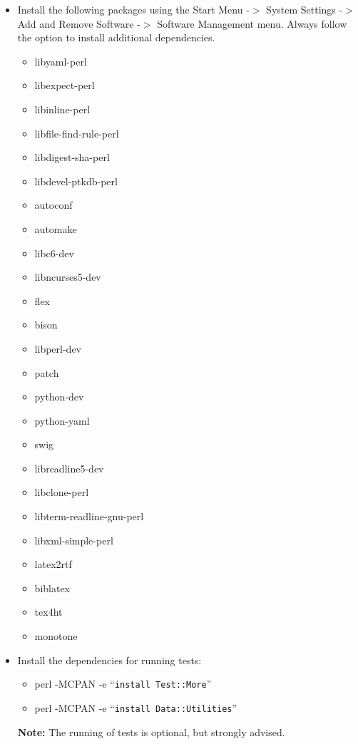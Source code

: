 \documentclass[12pt]{article}
\begin{document}
\begin{itemize}
\item[] Install the following packages using the Start Menu -$>$
  System Settings -$>$ Add and Remove Software -$>$ Software
  Management menu.  Always follow the option to install additional
  dependencies.
      \begin{itemize}
         \item libyaml-perl
         \item libexpect-perl
         \item libinline-perl
         \item libfile-find-rule-perl
         \item libdigest-sha-perl
         \item libdevel-ptkdb-perl
         \item autoconf
         \item automake
         \item libc6-dev
         \item libncurses5-dev
         \item flex
         \item bison
         \item libperl-dev
         \item patch
         \item python-dev
         \item python-yaml
         \item swig
         \item libreadline5-dev
         \item libclone-perl
         \item libterm-readline-gnu-perl
         \item libxml-simple-perl
         \item latex2rtf
         \item biblatex
         \item tex4ht
         \item monotone
      \end{itemize}
   \item[] Install the dependencies for running tests:
      \begin{itemize}
         \item perl -MCPAN -e ``{\tt install Test::More}''
         \item perl -MCPAN -e ``{\tt install Data::Utilities}''
      \end{itemize}
      {\bf Note:} The running of tests is optional, but strongly advised.
 \end{itemize}
\end{document}
